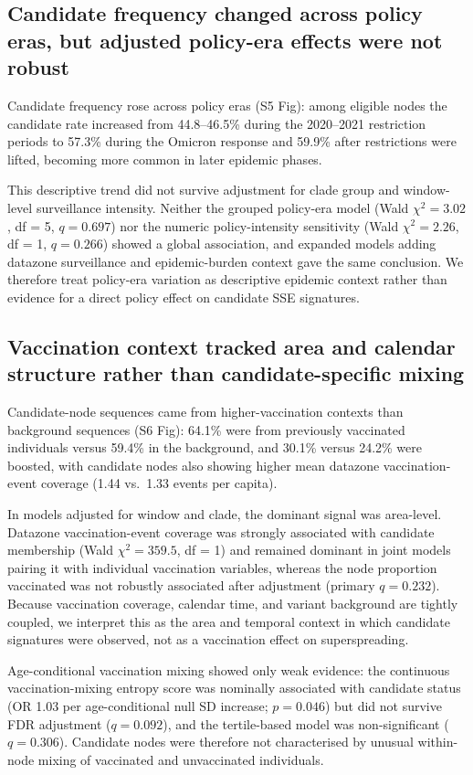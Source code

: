 \documentclass[10pt,letterpaper]{article}
\begin{document}
\subsection*{Candidate frequency changed across policy eras, but adjusted policy-era effects were not robust}

Candidate frequency rose across policy eras (S5 Fig): among eligible nodes the candidate rate increased from 44.8--46.5\% during the 2020--2021 restriction periods to 57.3\% during the Omicron response and 59.9\% after restrictions were lifted, becoming more common in later epidemic phases.

This descriptive trend did not survive adjustment for clade group and window-level surveillance intensity. Neither the grouped policy-era model (Wald $\chi^2 = 3.02$, df = 5, $q = 0.697$) nor the numeric policy-intensity sensitivity (Wald $\chi^2 = 2.26$, df = 1, $q = 0.266$) showed a global association, and expanded models adding datazone surveillance and epidemic-burden context gave the same conclusion. We therefore treat policy-era variation as descriptive epidemic context rather than evidence for a direct policy effect on candidate SSE signatures.

\subsection*{Vaccination context tracked area and calendar structure rather than candidate-specific mixing}

Candidate-node sequences came from higher-vaccination contexts than background sequences (S6 Fig): 64.1\% were from previously vaccinated individuals versus 59.4\% in the background, and 30.1\% versus 24.2\% were boosted, with candidate nodes also showing higher mean datazone vaccination-event coverage (1.44 vs.\ 1.33 events per capita).

In models adjusted for window and clade, the dominant signal was area-level. Datazone vaccination-event coverage was strongly associated with candidate membership (Wald $\chi^2 = 359.5$, df = 1) and remained dominant in joint models pairing it with individual vaccination variables, whereas the node proportion vaccinated was not robustly associated after adjustment (primary $q = 0.232$). Because vaccination coverage, calendar time, and variant background are tightly coupled, we interpret this as the area and temporal context in which candidate signatures were observed, not as a vaccination effect on superspreading.

Age-conditional vaccination mixing showed only weak evidence: the continuous vaccination-mixing entropy score was nominally associated with candidate status (OR 1.03 per age-conditional null SD increase; $p = 0.046$) but did not survive FDR adjustment ($q = 0.092$), and the tertile-based model was non-significant ($q = 0.306$). Candidate nodes were therefore not characterised by unusual within-node mixing of vaccinated and unvaccinated individuals.
\end{document}
